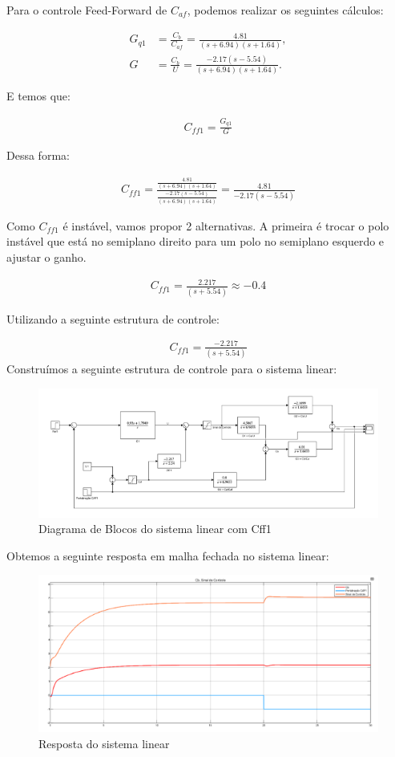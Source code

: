 \documentclass[a4paper,12pt]{article}
\begin{document}
Para o controle Feed-Forward de \(C_{af}\), podemos realizar os seguintes cálculos:

\begin{align}
G_{q1} &= \frac{C_b}{C_{af}} = \frac{4.81}{(s + 6.94)(s + 1.64)}, \\
G &= \frac{C_b}{U} = \frac{-2.17(s-5.54)}{(s + 6.94)(s + 1.64)}.
\end{align}

E temos que:

\begin{align}
C_{ff1} = \frac{G_{q1}}{G}
\end{align}

Dessa forma:

\begin{align}
C_{ff1} = \frac{\frac{4.81}{(s+6.94)(s+1.64)}}{\frac{-2.17(s-5.54)}{(s+6.94)(s+1.64)}} = \frac{4.81}{-2.17(s-5.54)}
\end{align}

Como \(C_{ff1}\) é instável, vamos propor 2 alternativas. A primeira é trocar o polo instável que está no semiplano direito para um polo no semiplano esquerdo e ajustar o ganho.

\begin{align}
C_{ff1} = \frac{2.217}{(s+5.54)} \approx -0.4
\end{align}

Utilizando a seguinte estrutura de controle:

\begin{align}
C_{ff1} = \frac{-2.217}{(s+5.54)}
\end{align}
Construímos a seguinte estrutura de controle para o sistema linear:

\begin{figure} [H]
    \centering
    \includegraphics[width=0.8\linewidth]{image12.png}
    \caption{Diagrama de Blocos do sistema linear com Cff1}    
\end{figure}

Obtemos a seguinte resposta em malha fechada no sistema linear: 

\begin{figure} [H]
    \centering
    \includegraphics[width=0.8\linewidth]{image13.png}
    \caption{Resposta do sistema linear}    
\end{figure}
\end{document}
